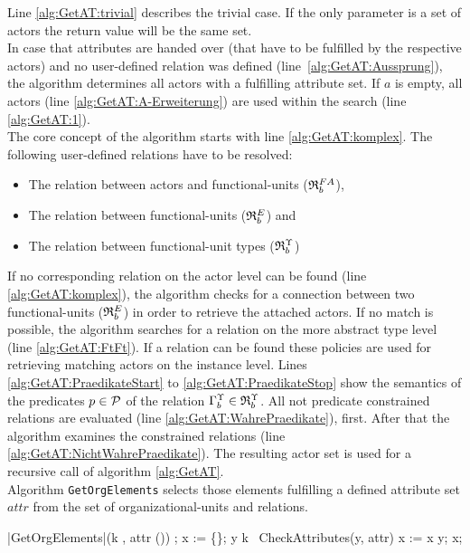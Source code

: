\noindent Line \ref{alg:GetAT:trivial} describes the trivial case. If the only parameter is a set of actors the return value will be the same set.\\

In case that attributes are handed over (that have to be fulfilled by the respective actors) and no user-defined relation was defined (line~\ref{alg:GetAT:Aussprung}), the algorithm determines all actors with a fulfilling attribute set. If $a$ is empty, all actors (line \ref{alg:GetAT:A-Erweiterung}) are used within the search (line \ref{alg:GetAT:1}). \\

The core concept of the algorithm starts with line \ref{alg:GetAT:komplex}. The following user-defined relations have to be resolved:
\begin{itemize}
	\item The relation between actors and functional-units (${\mathfrak{R}}^{FA}_{b}$),
	\item The relation between functional-units ($\relmengebenutzerinstOE_F$) and
	\item The relation between functional-unit types (${\mathfrak{R}}^{\Upsilon}_{b}$)
\end{itemize}

If no corresponding relation on the actor level can be found (line \ref{alg:GetAT:komplex}), the algorithm checks for a connection between two functional-units ($\relmengebenutzerinstOE_F$) in order to retrieve the attached actors. If no match is possible, the algorithm searches for a relation on the more abstract type level (line \ref{alg:GetAT:FtFt}). If a relation can be found these policies are used for retrieving matching actors on the instance level. Lines \ref{alg:GetAT:PraedikateStart} to \ref{alg:GetAT:PraedikateStop} show the semantics of the predicates $p \in \mathcal{P}$ of the relation ${\Gamma}^{\Upsilon}_{b} \in {\mathfrak{R}}^{\Upsilon}_{b}$. All not predicate constrained relations are evaluated (line \ref{alg:GetAT:WahrePraedikate}), first. After that the algorithm examines the constrained relations (line \ref{alg:GetAT:NichtWahrePraedikate}).  The resulting actor set is used for a recursive call of algorithm \ref{alg:GetAT}.\\

\noindent Algorithm {\tt GetOrgElements} selects those elements fulfilling a defined attribute set $attr$ from the set of organizational-units and relations.

	\begin{samepage}
	{\small
	\NumberProgramstrue
	\begin{algorithm}[GetOrgElements]\label{alg:GetOrgElements}
	\begin{program}
	\FUNCT |GetOrgElements|(k \subset \OrgElementMenge \cup \relationen, attr \subset (\Bezeichner \times \WerteMenge)) \subset \OrgElementMenge \cup \relationen
	\BEGIN
	\var {};
	x := \{\};
	\FOREACH y \in k~\DO
		\IF CheckAttributes(y, attr)
		\THEN
			x := x \cup y;
		\FI
	\OD
	\RETURN \quad x;
	\END
	\end{program}
	\end{algorithm}
	\NumberProgramsfalse
	}
	\end{samepage}


